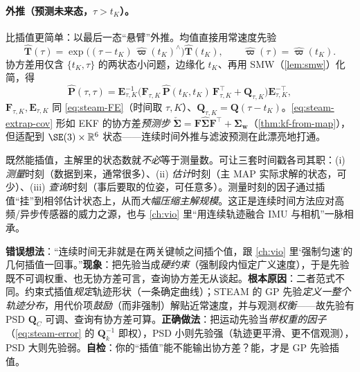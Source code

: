 \paragraph{外推（预测未来态，$\tau>t_K$）。}
比插值更简单：以最后一态“悬臂”外推。均值直接用常速度先验
\begin{equation}
  \hat{\mathbf{T}}(\tau)=\exp\!\big((\tau-t_K)\,\hat{\boldsymbol{\varpi}}(t_K)^\wedge\big)\hat{\mathbf{T}}(t_K),\qquad
  \hat{\boldsymbol{\varpi}}(\tau)=\hat{\boldsymbol{\varpi}}(t_K).
  \label{eq:steam-extrap}
\end{equation}
协方差用仅含 $\{t_K,\tau\}$ 的两状态小问题，边缘化 $t_K$、再用 SMW（\cref{lem:smw}）化简，得
\begin{equation}
  \hat{\mathbf{P}}(\tau,\tau)=\mathbf{E}_{\tau,K}^{-1}\big(\mathbf{F}_{\tau,K}\,\hat{\mathbf{P}}(t_K,t_K)\,\mathbf{F}_{\tau,K}^\top+\mathbf{Q}_{\tau,K}\big)\mathbf{E}_{\tau,K}^{-\top},
  \label{eq:steam-extrap-cov}
\end{equation}
$\mathbf{F}_{\tau,K},\mathbf{E}_{\tau,K}$ 同 \cref{eq:steam-FE}（时间取 $\tau,K$）、$\mathbf{Q}_{\tau,K}=\mathbf{Q}(\tau-t_K)$。\cref{eq:steam-extrap-cov} 形如 EKF 的协方差\emph{预测步} $\check{\boldsymbol{\Sigma}}=\mathbf{F}\hat{\boldsymbol{\Sigma}}\mathbf{F}^\top+\boldsymbol{\Sigma}_{\mathbf{w}}$（\cref{thm:kf-from-map}），但适配到 $\SE(3)\times\mathbb{R}^6$ 状态——连续时间外推与滤波预测在此漂亮地打通。

\begin{insight}
既然能插值，主解里的状态数就\emph{不必}等于测量数。可让三套时间戳各司其职：(i) \emph{测量}时刻（数据到来，通常很多）、(ii) \emph{估计}时刻（主 MAP 实际求解的状态，可少）、(iii) \emph{查询}时刻（事后要取的位姿，可任意多）。测量时刻的因子通过插值“挂”到相邻估计状态上，从而\emph{大幅压缩主解规模}。这正是连续时间方法应对高频/异步传感器的威力之源，也与 \cref{ch:vio} 里“用连续轨迹融合 IMU 与相机”一脉相承。
\end{insight}

\begin{pitfall}
\textbf{错误想法}：“连续时间无非就是在两关键帧之间插个值，跟 \cref{ch:vio} 里‘强制匀速’的几何插值一回事。”\textbf{现象}：把先验当成\emph{硬约束}（强制段内恒定广义速度），于是先验既不可调权重、也无协方差可言，查询协方差无从谈起。\textbf{根本原因}：二者范式不同。约束式插值\emph{规定}轨迹形状（一条确定曲线）；STEAM 的 GP 先验\emph{定义一整个轨迹分布}，用代价项\emph{鼓励}（而非强制）解贴近常速度，并与观测\emph{权衡}——故先验有 PSD $\mathbf{Q}_C$ 可调、查询有协方差可算。\textbf{正确做法}：把运动先验当\emph{带权重的因子}（\cref{eq:steam-error} 的 $\mathbf{Q}_k^{-1}$ 即权），PSD 小则先验强（轨迹更平滑、更不信观测），PSD 大则先验弱。\textbf{自检}：你的“插值”能不能输出协方差？能，才是 GP 先验插值。
\end{pitfall}


